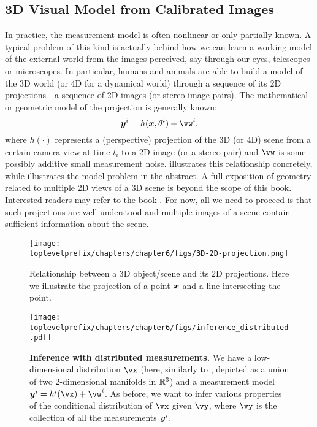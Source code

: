 \documentclass[../../book-main.tex]{subfiles}
\begin{document}
\subsection{3D Visual Model from Calibrated Images}
In practice, the measurement model is often nonlinear or only partially known. A typical problem of this kind is actually behind how we can learn a working model of the external world from the images perceived, say through our eyes, telescopes or microscopes. In particular, humans and animals are able to build a model of the 3D world (or 4D for a dynamical world) through a sequence of its 2D projections—a sequence of 2D images (or stereo image pairs). The mathematical or geometric model of the projection is generally known:
\begin{equation}
    \y^i = h(\x, \theta^i) +\vw^{i}, 
\end{equation}
where $h(\cdot)$ represents a (perspective) projection of the 3D (or 4D) scene from a certain camera view at time $t_i$ to a 2D image (or a stereo pair) and $\vw$ is some possibly additive small measurement noise.  illustrates this relationship concretely, while  illustrates the model problem in the abstract. A full exposition of geometry related to multiple 2D views of a 3D scene is beyond the scope of this book. Interested readers may refer to the book \cite{MaY2003}. For now, all we need to proceed is that such projections are well understood and multiple images of a scene contain sufficient information about the scene.
\begin{figure}[t]
    \centering
    \texttt{[image: \\toplevelprefix/chapters/chapter6/figs/3D-2D-projection.png]}
    \caption{Relationship between a 3D object/scene and its 2D projections. Here we illustrate the projection of a point $\bm{x}$ and a line intersecting the point.}
    \label{fig:projection-2D}
\end{figure}

\begin{figure}[t]
  \centering 
  \texttt{[image: \\toplevelprefix/chapters/chapter6/figs/inference\_distributed.pdf]}
  \caption{\small \textbf{Inference with distributed measurements.} We have a low-dimensional distribution \(\vx\) (here, similarly to , depicted as a union of two \(2\)-dimensional manifolds in \(\mathbb{R}^{3}\)) and a measurement model \(\y^{i} = h^{i}(\vx) + \vw^{i}\). As before, we want to infer various properties of the conditional distribution of \(\vx\) given \(\vy\), where \(\vy\) is the collection of all the measurements \(\bm{y}^{i}\).}
  \label{fig:inference_distributed}
\end{figure}
\end{document}
